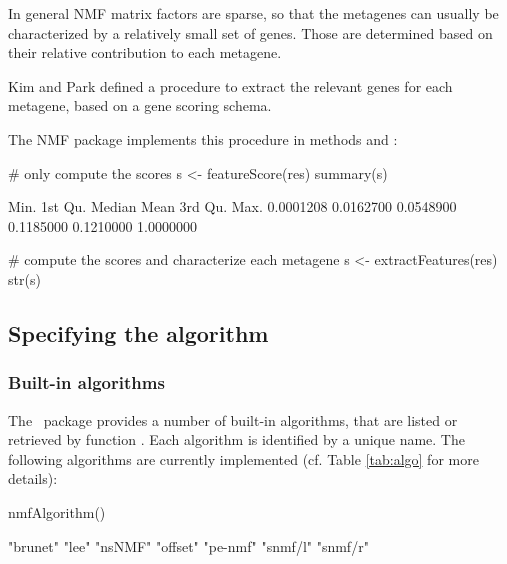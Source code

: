 \documentclass[a4paper]{article}
\newcommand{\nmfpack}{\code{NMF}\ }
\begin{document}
In general NMF matrix factors are sparse, so that the metagenes can usually be 
characterized by a relatively small set of genes. Those are determined based on 
their relative contribution to each metagene.

Kim and Park \cite{Kim2007} defined a procedure to extract the relevant genes for each 
metagene, based on a gene scoring schema.

The NMF package implements this procedure in methods  and 
:

\begin{Schunk}
\begin{Sinput}
 # only compute the scores
 s <- featureScore(res)
 summary(s)
\end{Sinput}
\begin{Soutput}
     Min.   1st Qu.    Median      Mean   3rd Qu.      Max. 
0.0001208 0.0162700 0.0548900 0.1185000 0.1210000 1.0000000 
\end{Soutput}
\begin{Sinput}
 # compute the scores and characterize each metagene
 s <- extractFeatures(res)
 str(s)
\end{Sinput}
\end{Schunk}

\subsection{Specifying the algorithm}\label{sec:algo}

\subsubsection{Built-in algorithms}
The \nmfpack package provides a number of built-in algorithms, that are listed or 
retrieved by function . 
Each algorithm is identified by a unique name.
The following algorithms are currently implemented (cf. Table \ref{tab:algo} 
for more details):

\begin{Schunk}
\begin{Sinput}
 nmfAlgorithm()
\end{Sinput}
\begin{Soutput}
[1] "brunet" "lee"    "nsNMF"  "offset" "pe-nmf" "snmf/l" "snmf/r"
\end{Soutput}
\end{Schunk}
\end{document}
